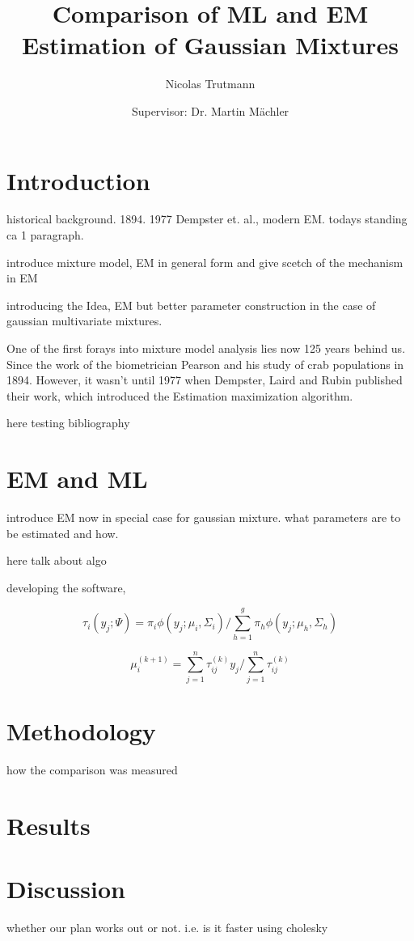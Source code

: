 


\title{Comparison of ML and EM Estimation of Gaussian Mixtures}
\author{Nicolas Trutmann \and Supervisor: Dr. Martin Mächler}




\maketitle

\tableofcontents

\section{Introduction}

historical background. 1894. 1977 Dempster et. al., modern EM. todays standing ca 1 paragraph.

introduce mixture model, EM in general form and give scetch of the mechanism in EM

introducing the Idea, EM but better parameter construction in the case of gaussian multivariate mixtures.

One of the first forays into mixture model analysis lies now 125 years behind us. Since the work of the biometrician Pearson and his study of crab populations in 1894. However, it wasn't until 1977 when Dempster, Laird and Rubin published their work, which introduced the Estimation maximization algorithm.

here testing bibliography \cite{McLP00} \cite{McL17}



\section{EM and ML}

introduce EM now in special case for gaussian mixture. what parameters are to be estimated and how.

here talk about algo

developing the software,


\[ \tau_{i}(y_j; \Psi) = \pi_i \phi(y_j; \mu_i, \Sigma_i) / \sum_{h=1}^g \pi_h \phi(y_j;\mu_h, \Sigma_h) \]

\[ \mu_i^{(k+1)} = \sum_{j=1}^n \tau_{ij}^{(k)} y_j /\sum_{j=1}^n \tau_{ij}^{(k)} \]

\section{Methodology}

how the comparison was measured

\section{Results}

\section{Discussion}

whether our plan works out or not. i.e. is it faster using cholesky






